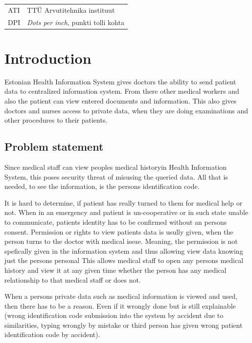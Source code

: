 \documentclass[a4paper, 12pt]{article}
\let\stdsection\section
\renewcommand\section{\newpage\stdsection}
\begin{document}
\begin{tabular}{p{3cm}p{11cm}}
ATI&TTÜ Arvutitehnika instituut\\
DPI&\textit{Dots per inch}, punkti tolli kohta

\end{tabular}
\pagebreak
\tableofcontents
\newpage
\listoffigures
\pagebreak
\listoftables
\pagebreak
\section{Introduction}
\label{Introduction} %
Estonian Health Information System gives doctors the ability to send patient data to centralized information system. From there other medical workers and also the patient can view entered documents and information. This also gives doctors and nurses access to private data, when they are doing examinations and other procedures to their patients. 

\subsection{Problem statement}
Since medical staff can view peoples medical historyin Health Information System, this poses security threat of misusing the queried data. All that is needed, to see the information, is the persons identification code. 

It is hard to determine, if patient has really turned to them for medical help or not. 
When in an emergency and patient is un-cooperative or in such state unable to communicate, patients identity has to be confirmed without an persons consent.
Permission or rights to view patients data is usully given, when the person turns to the doctor with medical issue. 
Meaning, the permission is not spefically given in the information system and thus allowing view data knowing just the persons personal 
This allows medical staff to open any persons medical history and view it at any given time whether the person has any medical relationship to that medical staff or does not. 

When a persons private data such as medical information is viewed and used, then there has to be a reason. Even if it wrongly done but is still explainable (wrong identification code submission into the system by accident due to similarities, typing wrongly by mistake or third person has given wrong patient identification code by accident). 
\end{document}
